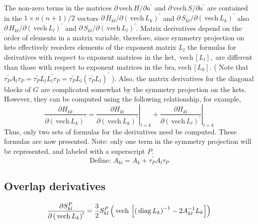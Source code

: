 \documentclass[12pt,thmsa,suthesis,verbatim]{report}
\begin{document}
The non-zero terms in the matrices $\partial \,\mathrm{vech}\,H/\partial
a^{\prime }$ and $\partial \,\mathrm{vech}\,S/\partial a^{\prime }$ are
contained in the $1\times n\left( n+1\right) /2$ vectors $\partial
\,H_{kl}/\partial \left( \,\mathrm{vech}\,L_k\right) ^{\prime }$ and $%
\partial \,S_{kl}/\partial \left( \,\mathrm{vech}\,L_k\right) ^{\prime }$
also\\$\partial \,H_{kl}/\partial \left( \,\mathrm{vech}\,L_l\right)
^{\prime }$ and $\partial \,S_{kl}/\partial \left( \,\mathrm{vech}%
\,L_l\right) ^{\prime }$. Matrix derivatives depend on the order of elements
in a matrix variable, therefore, since symmetry projection on kets
effectively reorders elements of the exponent matrix $L_l$ the formulas for
derivatives with respect to exponent matrices in the ket, $\,\mathrm{vech}%
\,\left[ L_l\right] ,$ are different than those with respect to exponent
matrices in the bra,$\,\mathrm{vech}\,\left[ L_k\right] $. ( Note that $\tau
_P^{\prime }A_l\tau _P=\tau _P^{\prime }L_lL_l^{\prime }\tau _P=\tau
_P^{\prime }L_l\left( \tau _P^{\prime }L_l\right) ^{\prime }$ ). Also, the
matrix derivatives for the diagonal blocks of $G$ are complicated somewhat
by the symmetry projection on the kets. However, they can be computed using
the following relationship, for example, 
\begin{equation}
\frac{\partial H_{kk}}{\partial \left( \,\mathrm{vech}\,L_k\right) ^{\prime }%
}=\left. \frac{\partial H_{kl}}{\partial \left( \,\mathrm{vech}\,L_k\right)
^{\prime }}\right| _{l=k}+\left. \frac{\partial H_{kl}}{\partial \left( \,%
\mathrm{vech}\,L_l\right) ^{\prime }}\right| _{l=k}
\end{equation}
Thus, only two sets of formulas for the derivatives need be computed. These
formulas are now presented. Note: only one term in the symmetry projection
will be represented, and labeled with a superscript $P$. 
\begin{equation}
\text{Define: }A_{kl}=A_k+\tau _P^{\prime }A_l\tau _P
\end{equation}

\subsection{Overlap derivatives}

\begin{equation}
\frac{\partial S_{kl}^P}{\partial \left( \,\mathrm{vech}\,L_k\right)
^{\prime }}=\frac 32S_{kl}^P\left( \,\mathrm{vech}\,\left[ \left( \,\mathrm{%
diag}\,L_k\right) ^{-1}-2A_{kl}^{-1}L_k\right] \right)
\end{equation}
\end{document}
